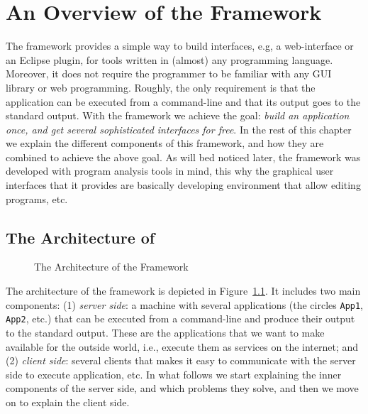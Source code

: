 {%
}


\chapter{An Overview of the \ei Framework}
\label{ch:overview}

The \ei framework provides a simple way to build interfaces, e.g, a
web-interface or an Eclipse plugin, for tools written in (almost) any
programming language.
%
Moreover, it does not require the programmer to be familiar with any
GUI library or web programming. Roughly, the only requirement is that
the application can be executed from a command-line and that its
output goes to the standard output.
%
With the \ei framework we achieve the goal: \emph{build an application
  once, and get several sophisticated interfaces for free}.
%
In the rest of this chapter we explain the different components of
this framework, and how they are combined to achieve the above goal.
%
As will bed noticed later, the \ei framework was developed with
program analysis tools in mind, this why the graphical user interfaces
that it provides are basically developing environment that allow
editing programs, etc.

\section{The Architecture of \ei}
\label{ch:overview:arch}

\begin{figure}[h]
\begin{center}
\end{center}
\caption{The Architecture of the \ei Framework}
\label{fig:eiframework}
\end{figure}

The architecture of the \ei framework is depicted in
Figure~\ref{fig:eiframework}. It includes two main components:
%
(1) \emph{server side}: a machine with several applications (the
circles \texttt{App1}, \texttt{App2}, etc.) that can be executed from
a command-line and produce their output to the standard output. These
are the applications that we want to make available for the outside
world, i.e., execute them as services on the internet; and
%
(2) \emph{client side}: several clients that makes it easy to
  communicate with the server side to execute application, etc.
%
In what follows we start explaining the inner components of the server
side, and which problems they solve, and then we move on to explain the
client side.

